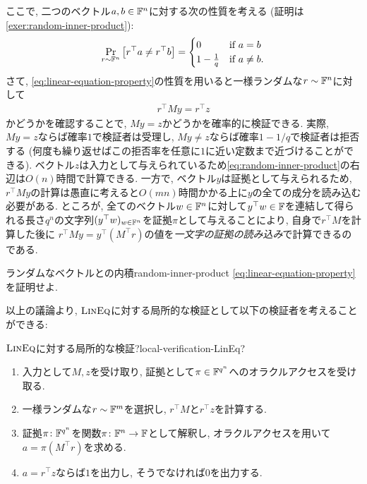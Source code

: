 ここで, 二つのベクトル$a,b\in\mathbb{F}^n$に対する次の性質を考える (証明は\cref{exer:random-inner-product}):
\begin{align}
  \Pr_{r\sim \mathbb{F}^n} \qty[ r^\top a \ne r^\top b ] = \begin{cases}
    0 & \text{if } a=b \\
    1-\frac{1}{q} & \text{if } a\ne b.
  \end{cases} \label{eq:linear-equation-property}
\end{align}
さて, \cref{eq:linear-equation-property}の性質を用いると一様ランダムな$r\sim\mathbb{F}^n$に対して
\begin{align}
  r^\top M y = r^\top z \label{eq:random-inner-product}
\end{align}
かどうかを確認することで, $My=z$かどうかを確率的に検証できる.
実際, $My=z$ならば確率$1$で検証者は受理し,
$My\ne z$ならば確率$1-1/q$で検証者は拒否する (何度も繰り返せばこの拒否率を任意に$1$に近い定数まで近づけることができる).
ベクトル$z$は入力として与えられているため\cref{eq:random-inner-product}の右辺は$O(n)$時間で計算できる.
一方で, ベクトル$y$は証拠として与えられるため, $r^\top M y$の計算は愚直に考えると$O(mn)$時間かかる上に$y$の全ての成分を読み込む必要がある.
ところが, 全てのベクトル$w\in \mathbb{F}^n$に対して$y^\top w\in\mathbb{F}$を連結して得られる長さ$q^n$の文字列$(y^\top w)_{w\in \mathbb{F}^n}$を証拠$\pi$として与えることにより,
自身で$r^\top M$を計算した後に $r^\top M y = y^\top (M^\top r)$の値を\emph{一文字の証拠の読み込み}で計算できるのである.

\begin{exercise}{ランダムなベクトルとの内積}{random-inner-product}
  \cref{eq:linear-equation-property}を証明せよ.
\end{exercise}

以上の議論より, $\textsc{LinEq}$に対する局所的な検証として以下の検証者を考えることができる:
\begin{algorithm}{$\textsc{LinEq}$に対する局所的な検証?}{local-verification-LinEq?}
  \begin{enumerate}
  \item 入力として$M,z$を受け取り, 証拠として$\pi \in \mathbb{F}^{q^n}$へのオラクルアクセスを受け取る.
  \item 一様ランダムな$r\sim\mathbb{F}^m$を選択し, $r^\top M$と$r^\top z$を計算する.
  \item 証拠$\pi\colon \mathbb{F}^{q^n}$を関数$\pi\colon \mathbb{F}^n\to \mathbb{F}$として解釈し, オラクルアクセスを用いて$a=\pi(M^\top r)$を求める.
  \item $a=r^\top z$ならば$1$を出力し, そうでなければ$0$を出力する.
  \end{enumerate}
\end{algorithm}

